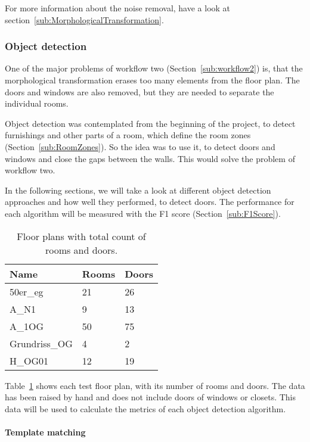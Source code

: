 For more information about the noise removal, have a look at section~\ref{sub:MorphologicalTransformation}.

\subsubsection{Object detection}
One of the major problems of workflow two (Section~\ref{sub:workflow2}) is, that the morphological transformation erases too many elements from the floor plan. The doors and windows are also removed, but they are needed to separate the individual rooms.

Object detection was contemplated from the beginning of the project, to detect furnishings and other parts of a room, which define the room zones (Section~\ref{sub:RoomZones}). So the idea was to use it, to detect doors and windows and close the gaps between the walls. This would solve the problem of workflow two.

In the following sections, we will take a look at different object detection approaches and how well they performed, to detect doors. The performance for each algorithm will be measured with the F1 score (Section~\ref{sub:F1Score}).

\begin{table}[H]
\centering
\caption{Floor plans with total count of rooms and doors.}
\label{tbl:FloorPlanData}
\begin{tabular}{@{}lll@{}}
\toprule
Name          & Rooms & Doors \\ \midrule
50er\_eg      & 21    & 26    \\
A\_N1         & 9     & 13    \\
A\_1OG        & 50    & 75    \\
Grundriss\_OG & 4     & 2     \\
H\_OG01       & 12    & 19    \\ \bottomrule
\end{tabular}
\end{table}

Table~\ref{tbl:FloorPlanData} shows each test floor plan, with its number of rooms and doors. The data has been raised by hand and does not include doors of windows or closets. This data will be used to calculate the metrics of each object detection algorithm.

\paragraph{Template matching}
\label{sub:ImpTemplateMatching}

